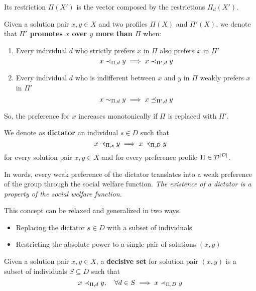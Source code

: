 Its restriction $\Pi (X')$ is the vector composed by the restrictions $\Pi_d (X')$. \\

\begin{definition}
	Given a solution pair $x, y \in X$ and two profiles $\Pi (X)$ and $\Pi'(X)$, we denote that \textbf{$\Pi'$ promotes $x$ over $y$ more than $\Pi$} when:
	\begin{enumerate}
		\item Every individual $d$ who strictly prefers $x$ in $\Pi$ also prefers $x$ in $\Pi'$ 
		$$ x \prec_{\Pi, d} y \implies x \prec_{\Pi', d} y $$
		
		\item Every individual $d$ who is indifferent between $x$ and $y$ in $\Pi$ weakly prefers $x$ in $\Pi'$
		$$ x \sim_{\Pi, d} y \implies x \preceq_{\Pi', d} y $$
	\end{enumerate}
\end{definition}
So, the preference for $x$ increases monotonically if $\Pi$ is replaced with $\Pi'$. \\

\begin{definition}
	We denote as \textbf{dictator} an individual $s \in D$ such that
	$$ x \prec_{\Pi, s} y \implies x \prec_{\Pi, D} y $$
	for every solution pair $x, y \in X$ and for every preference profile $\Pi \in \operatorname{\mathcal{D}}^{|D|}$.
\end{definition}

In words, every weak preference of the dictator translates into a weak preference of the group through the social welfare function. \textit{The existence of a dictator is a property of the social welfare function}.

This concept can be relaxed and generalized in two ways. 
\begin{itemize}
	\item Replacing the dictator $s \in D$ with a subset of individuals
	
	\item Restricting the absolute power to a single pair of solutions $(x, y)$ \\
\end{itemize}

\begin{definition}
	Given a solution pair $x,y \in X$, a \textbf{decisive set} for solution pair $(x, y)$ is a subset of individuals $S \subseteq D$ such that
	$$ x \prec_{\Pi, d} y, \quad \forall d \in S \implies x \prec_{\Pi, D} y $$
\end{definition}

